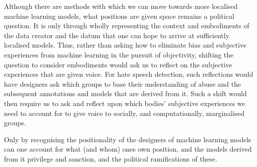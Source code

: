Although there are methods with which we can move towards more localised machine learning models, what positions are given space remains a political question.
It is only through wholly representing the context and embodiments of the data creator and the datum that one can hope to arrive at sufficiently localised models.
Thus, rather than asking how to eliminate bias and subjective experiences from machine learning in the pursuit of objectivity, shifting the question to consider embodiments would ask us to reflect on the subjective experiences that are given voice.
For hate speech detection, such reflections would have designers ask which groups to base their understanding of abuse and the subsequent annotations and models that are derived from it.
Such a shift would then require us to ask and reflect upon which bodies' subjective experiences we need to account for to give voice to socially, and computationally, marginalised groups.

Only by recognising the positionality of the designers  of machine learning models  can one account for what (and whom) ones own position, and the models derived from it privilege and sanction, and the political ramifications of these.

